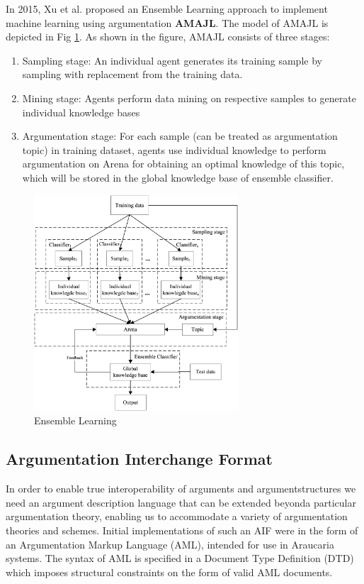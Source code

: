 \documentclass[sigconf]{acmart}
\begin{document}
In 2015, Xu et al. \cite{ensemblelearning} proposed an Ensemble Learning approach to implement 
machine learning using argumentation \textbf{AMAJL}. The model of AMAJL is depicted in Fig \ref{fig:ens}. As shown in the figure, AMAJL consists of three stages: 
\begin{enumerate}
  \item Sampling stage: An individual agent generates its training sample by sampling with replacement from the training data.
  \item Mining stage: Agents perform data mining on respective samples to generate individual knowledge bases
  \item Argumentation stage: For each sample (can be treated as argumentation topic) in training dataset, agents use individual knowledge to perform argumentation on Arena for obtaining an optimal knowledge of this topic, which will be stored in the global knowledge base of ensemble classifier.
\end{enumerate}
\begin{figure}
  \centering
  \includegraphics[width=3in]{images/ensemble.png}
  \caption{Ensemble Learning \cite{ensemblelearning}}
  \label{fig:ens}
\end{figure}
\subsection{Argumentation Interchange Format}
In order to enable true interoperability of arguments and argumentstructures we need an argument description language that can be extended beyonda particular argumentation theory, enabling us to accommodate a variety of argumentation theories and schemes. Initial implementations of such an AIF were in the form of an Argumentation Markup Language (AML), intended for use in Araucaria systems. The syntax of AML is specified in a Document Type Definition (DTD) which imposes structural constraints on the form of valid AML documents.
\end{document}
